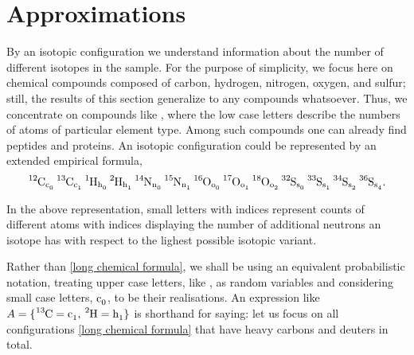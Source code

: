 \section{Approximations}

By an isotopic configuration we understand information about the number of different isotopes in the sample. For the purpose of simplicity, we focus here on chemical compounds composed of carbon, hydrogen, nitrogen, oxygen, and sulfur; still, the results of this section generalize to any compounds whatsoever. Thus, we concentrate on compounds like \molecule, where the low case letters describe the numbers of atoms of particular element type. Among such compounds one can already find peptides and proteins. An isotopic configuration could be represented by an extended empirical formula, 
\begin{equation}\label{long chemical formula}
	\text{\moleculeIsotopic}.
\end{equation}

In the above representation, small letters with indices represent counts of different atoms with indices displaying the number of additional neutrons an isotope has with respect to the lighest possible isotopic variant. 

Rather than \eqref{long chemical formula}, we shall be using an equivalent probabilistic notation, treating upper case letters, like , as random variables and considering small case letters, $\cem{c_0}$, to be their realisations. An expression like $A = \{ \ce{^{13}C} = \cem{c_1},\, \ce{^{2}H} = \cem{h_1} \}$ is shorthand for saying: let us focus on all configurations \eqref{long chemical formula} that have  heavy carbons and  deuters in total.


